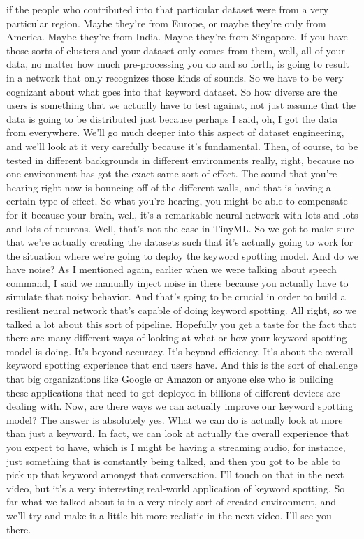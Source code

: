 if the people who contributed into that particular dataset
were from a very particular region.
Maybe they're from Europe, or maybe they're only from America.
Maybe they're from India.
Maybe they're from Singapore.
If you have those sorts of clusters and your dataset only comes from them,
well, all of your data, no matter how much pre-processing you do
and so forth, is going to result in a network
that only recognizes those kinds of sounds.
So we have to be very cognizant about what goes into that keyword dataset.
So how diverse are the users is something that we actually
have to test against, not just assume that the data is going
to be distributed just because perhaps I said,
oh, I got the data from everywhere.
We'll go much deeper into this aspect of dataset engineering,
and we'll look at it very carefully because it's fundamental.
Then, of course, to be tested in different backgrounds
in different environments really, right, because no one environment
has got the exact same sort of effect.
The sound that you're hearing right now is bouncing off of the different walls,
and that is having a certain type of effect.
So what you're hearing, you might be able to compensate
for it because your brain, well, it's a remarkable neural network
with lots and lots and lots of neurons.
Well, that's not the case in TinyML.
So we got to make sure that we're actually creating the datasets such
that it's actually going to work for the situation
where we're going to deploy the keyword spotting model.
And do we have noise?
As I mentioned again, earlier when we were talking about speech command,
I said we manually inject noise in there because you actually
have to simulate that noisy behavior.
And that's going to be crucial in order to build
a resilient neural network that's capable of doing keyword spotting.
All right, so we talked a lot about this sort of pipeline.
Hopefully you get a taste for the fact that there
are many different ways of looking at what
or how your keyword spotting model is doing.
It's beyond accuracy.
It's beyond efficiency.
It's about the overall keyword spotting experience that end users have.
And this is the sort of challenge that big organizations like Google or Amazon
or anyone else who is building these applications that
need to get deployed in billions of different devices are dealing with.
Now, are there ways we can actually improve our keyword spotting model?
The answer is absolutely yes.
What we can do is actually look at more than just a keyword.
In fact, we can look at actually the overall experience that you expect
to have, which is I might be having a streaming audio,
for instance, just something that is constantly being talked,
and then you got to be able to pick up that keyword amongst that conversation.
I'll touch on that in the next video, but it's
a very interesting real-world application of keyword spotting.
So far what we talked about is in a very nicely sort of created environment,
and we'll try and make it a little bit more realistic in the next video.
I'll see you there.


